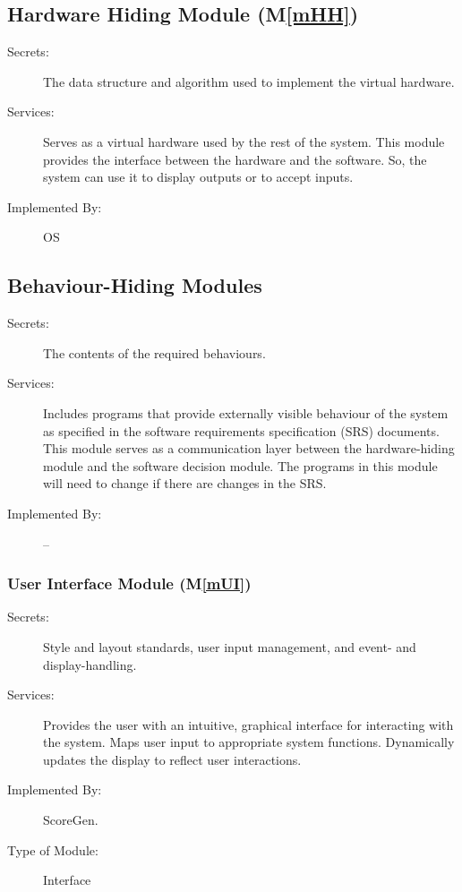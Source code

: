 \documentclass[12pt, titlepage]{article}
\newcommand{\mref}[1]{M\ref{#1}}
\begin{document}
\subsection{Hardware Hiding Module (\mref{mHH})}

\begin{description}
\item[Secrets:]The data structure and algorithm used to implement the virtual
  hardware.
\item[Services:]Serves as a virtual hardware used by the rest of the
  system. This module provides the interface between the hardware and the
  software. So, the system can use it to display outputs or to accept inputs.
\item[Implemented By:] OS
\end{description}

\subsection{Behaviour-Hiding Modules}

\begin{description}
\item[Secrets:] The contents of the required behaviours.
\item[Services:] Includes programs that provide externally visible behaviour of
  the system as specified in the software requirements specification (SRS)
  documents. This module serves as a communication layer between the
  hardware-hiding module and the software decision module. The programs in this
  module will need to change if there are changes in the SRS.
\item[Implemented By:] --
\end{description}

\subsubsection{User Interface Module (\mref{mUI})}

\begin{description}
\item[Secrets:] Style and layout standards, user input management, and event- and display-handling.
\item[Services:] Provides the user with an intuitive, graphical interface for interacting with the system.
  Maps user input to appropriate system functions. Dynamically updates the display to reflect user interactions.
\item[Implemented By:] ScoreGen.
\item[Type of Module:] Interface
\end{description}
\end{document}
